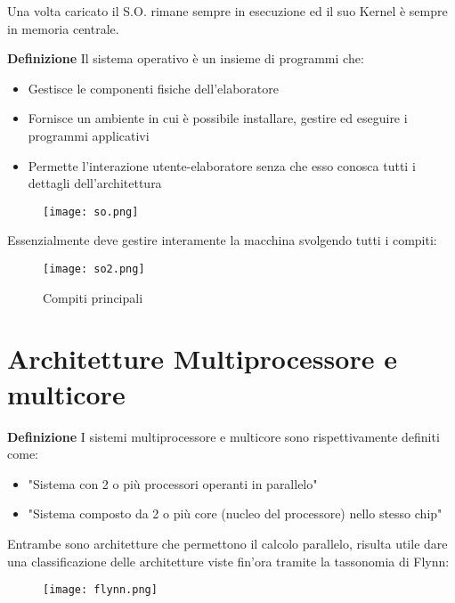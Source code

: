 \documentclass{article}
\begin{document}
\noindent Una volta caricato il S.O. rimane sempre in esecuzione ed il suo Kernel è sempre in memoria centrale.\newline

\noindent\textbf{Definizione} Il sistema operativo è un insieme di programmi che:
\begin{itemize}
    \item Gestisce le componenti fisiche dell'elaboratore
    
    \item Fornisce un ambiente in cui è possibile installare, gestire ed eseguire i programmi applicativi

    \item Permette l’interazione utente-elaboratore senza che esso conosca tutti i dettagli dell’architettura

\end{itemize}

\begin{figure}[ht]
    \centering
    \texttt{[image: so.png]}
    \label{fig:so}
\end{figure}

\noindent Essenzialmente deve gestire interamente la macchina svolgendo tutti i compiti:

\begin{figure}[ht]
    \centering
    \texttt{[image: so2.png]}
    \caption{Compiti principali}
    \label{fig:so2}
\end{figure}

\section{Architetture Multiprocessore e multicore}

\textbf{Definizione} I sistemi multiprocessore e multicore sono rispettivamente definiti come:
\begin{itemize}
    \item "Sistema con 2 o più processori operanti in parallelo"
    \item "Sistema composto da 2 o più core (nucleo del processore) nello stesso chip"\newline
\end{itemize}

\noindent Entrambe sono architetture che permettono il calcolo parallelo, risulta utile dare una classificazione delle architetture viste fin'ora tramite la tassonomia di Flynn:

\begin{figure}[ht]
    \centering
    \texttt{[image: flynn.png]}
    \label{fig:flynn}
\end{figure}
\end{document}

